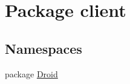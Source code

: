 \hypertarget{namespaceclient}{\section{Package client}
\label{namespaceclient}
}
\subsection*{Namespaces}
\begin{DoxyCompactItemize}
\item 
package \hyperlink{namespaceclient_1_1Droid}{Droid}
\end{DoxyCompactItemize}
